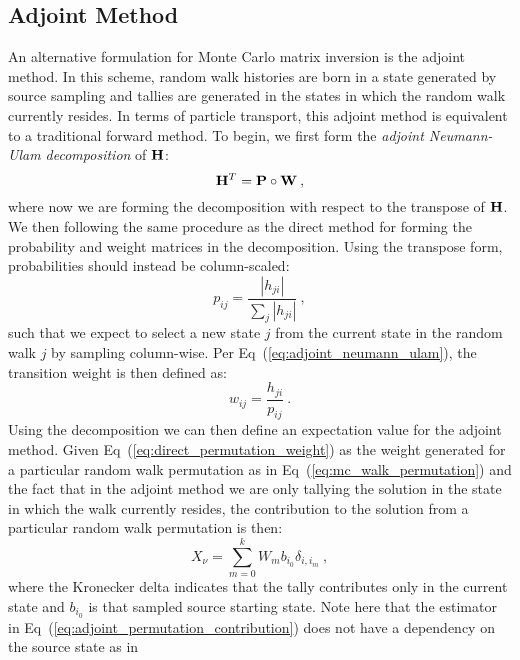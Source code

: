 \subsection{Adjoint Method}
\label{subsec:adjoint_mc}
An alternative formulation for Monte Carlo matrix inversion is the
adjoint method. In this scheme, random walk histories are born in a
state generated by source sampling and tallies are generated in the
states in which the random walk currently resides. In terms of
particle transport, this adjoint method is equivalent to a traditional
forward method. To begin, we first form the \textit{adjoint
  Neumann-Ulam decomposition} of $\mathbf{H}$:
\begin{equation}
  \mathbf{H}^T = \mathbf{P} \circ \mathbf{W}\:,
  \label{eq:adjoint_neumann_ulam}
\end{equation}
where now we are forming the decomposition with respect to the
transpose of $\mathbf{H}$. We then following the same procedure as the
direct method for forming the probability and weight matrices in the
decomposition. Using the transpose form, probabilities should instead
be column-scaled:
\begin{equation}
  p_{ij} = \frac{|h_{ji}|}{\sum_j |h_{ji}|}\:,
  \label{eq:adjoint_probability}
\end{equation}
such that we expect to select a new state $j$ from the current state
in the random walk $j$ by sampling column-wise. Per
Eq~(\ref{eq:adjoint_neumann_ulam}), the transition weight is then
defined as:
\begin{equation}
  w_{ij} = \frac{h_{ji}}{p_{ij}}\:.
  \label{eq:adjoint_weight}
\end{equation}
Using the decomposition we can then define an expectation value for
the adjoint method. Given Eq~(\ref{eq:direct_permutation_weight}) as
the weight generated for a particular random walk permutation as in
Eq~(\ref{eq:mc_walk_permutation}) and the fact that in the adjoint
method we are only tallying the solution in the state in which the
walk currently resides, the contribution to the solution from a
particular random walk permutation is then:
\begin{equation}
  X_{\nu} = \sum_{m=0}^k W_{m} b_{i_0} \delta_{i,i_m}\:,
  \label{eq:adjoint_permutation_contribution}
\end{equation}
where the Kronecker delta indicates that the tally contributes only in
the current state and $b_{i_0}$ is that sampled source starting
state. Note here that the estimator in
Eq~(\ref{eq:adjoint_permutation_contribution}) does not have a
dependency on the source state as in
